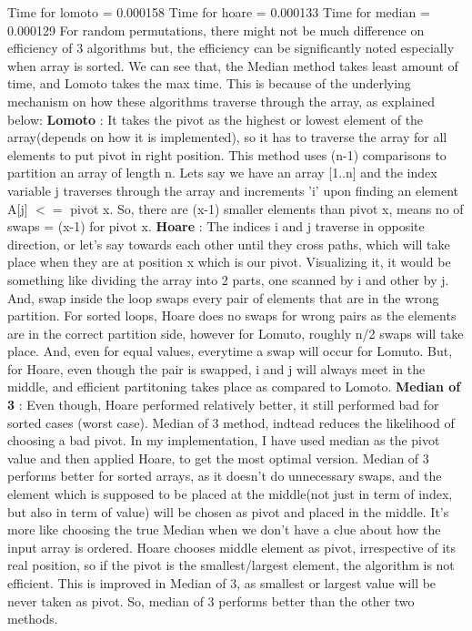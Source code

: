 \documentclass[a4paper,12pt]{article}
\begin{document}
{{Time for lomoto = 0.000158 \newline \newline
Time for hoare = 0.000133 \newline \newline
Time for median = 0.000129 \newline \newline
For random permutations, there might not be much difference on efficiency of 3 algorithms but, the efficiency can be significantly noted especially when array is sorted. We can see that, the Median method takes least amount of time, and Lomoto takes the max time. This is because of the underlying mechanism on how these algorithms traverse through the array, as explained below: \newline
{}\textbf{ Lomoto} : It takes the pivot as the highest or lowest element of the array(depends on how it is implemented), so it has to traverse the array for all elements to put pivot in right position. This method uses (n-1) comparisons to partition an array of length n. Lets say we have an array [1..n] and the index variable j traverses through the array and increments 'i' upon finding an element A[j] $ < = $ pivot x. So, there are (x-1) smaller elements than pivot x, means no of swaps = (x-1) for pivot x.\newline{} \textbf{ Hoare} : The indices i and j traverse in opposite direction, or let's say towards each other until they cross paths, which will take place when they are at position x which is our pivot. Visualizing it, it would be something like dividing the array into 2 parts, one scanned by i and other by j. And, swap inside the loop swaps every pair of elements that are in the wrong partition. For sorted loops, Hoare does no swaps for wrong pairs as the elements are in the correct partition side, however for Lomuto,  roughly n/2 swaps will take place. And, even for equal values, everytime a swap will occur for Lomuto. But, for Hoare, even though the pair is swapped, i and j will always meet in the middle, and efficient partitoning takes place as compared to Lomoto. \newline {} \textbf{ Median of 3} : Even though, Hoare performed relatively better, it still performed bad for sorted cases (worst case). Median of 3 method, indtead reduces the likelihood of choosing a bad pivot. In my implementation, I have used median as the pivot value and then applied Hoare, to get the most optimal version. Median of 3 performs better for sorted arrays, as it doesn't do unnecessary swaps, and the element which is supposed to be placed at the middle(not just in term of index, but also in term of value) will be chosen as pivot and placed in the middle.  It's more like choosing the true Median when we don't have a clue about how the input array is ordered. Hoare chooses middle element as pivot, irrespective of its real position, so if the pivot is the smallest/largest element, the algorithm is not efficient. This is improved in Median of 3, as smallest or largest value will be never taken as pivot. So, median of 3 performs better than the other two methods. \newline \newline
}}
\end{document}
